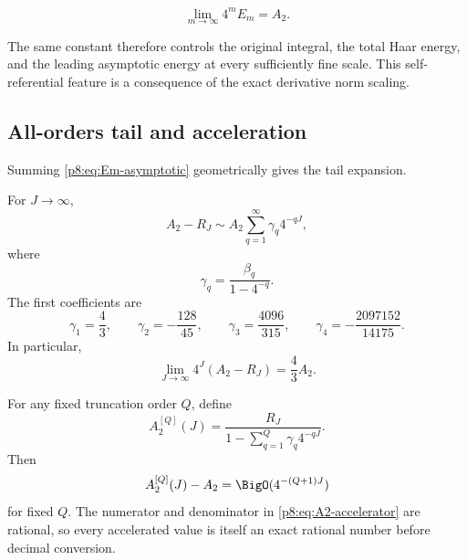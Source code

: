 \documentclass[11pt]{article}
\theoremstyle{definition}
\theoremstyle{remark}
\begin{document}
\begin{corollary}
\label{p8:cor:Em-leading}
\begin{equation}
 \boxed{\displaystyle
 \lim_{m\to\infty}4^mE_m=A_2.}                           \label{p8:eq:Em-leading}
\end{equation}
\end{corollary}

The same constant therefore controls the original integral, the total Haar
energy, and the leading asymptotic energy at every sufficiently fine scale.
This self-referential feature is a consequence of the exact derivative norm
scaling.

\subsection{All-orders tail and acceleration}

Summing \eqref{p8:eq:Em-asymptotic} geometrically gives the tail expansion.

\begin{corollary}
\label{p8:cor:A2-tail-asymptotic}
For $J\to\infty$,
\begin{equation}
 A_2-R_J\sim A_2\sum_{q=1}^\infty\gamma_q4^{-qJ},        \label{p8:eq:A2-tail-asymptotic}
\end{equation}
where
\begin{equation}
 \gamma_q=\frac{\beta_q}{1-4^{-q}}.                     \label{p8:eq:gamma-definition}
\end{equation}
The first coefficients are
\begin{equation}
 \gamma_1=\frac43,
 \qquad
 \gamma_2=-\frac{128}{45},
 \qquad
 \gamma_3=\frac{4096}{315},
 \qquad
 \gamma_4=-\frac{2097152}{14175}.                       \label{p8:eq:gamma-first}
\end{equation}
In particular,
\begin{equation}
 \boxed{\displaystyle
 \lim_{J\to\infty}4^J(A_2-R_J)=\frac43A_2.}             \label{p8:eq:A2-tail-leading}
\end{equation}
\end{corollary}

For any fixed truncation order $Q$, define
\begin{equation}
 A_2^{[Q]}(J)=
 \frac{R_J}{1-\sum_{q=1}^{Q}\gamma_q4^{-qJ}}.            \label{p8:eq:A2-accelerator}
\end{equation}
Then
\begin{equation}
 A_2^{[Q]}(J)-A_2=\BigO(4^{-(Q+1)J})                    \label{p8:eq:A2-accelerator-error}
\end{equation}
for fixed $Q$.  The numerator and denominator in
\eqref{p8:eq:A2-accelerator} are rational, so every accelerated value is itself
an exact rational number before decimal conversion.
\end{document}
